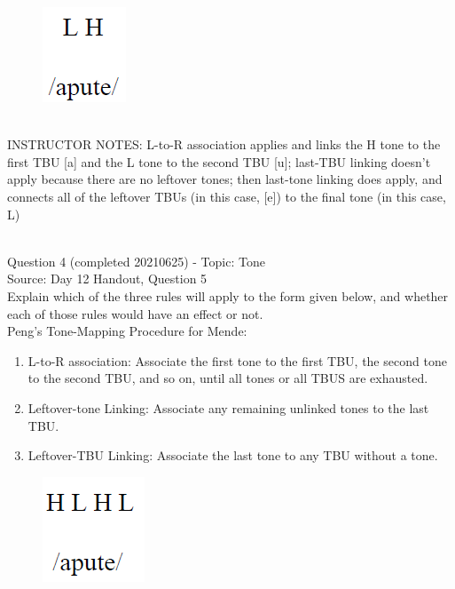\documentclass[12pt]{article}
\begin{document}
\begin{figure}[H]
\includegraphics{../images/mendetone_c.png}
\end{figure}

~\\
INSTRUCTOR NOTES: L-to-R association applies and links the H tone to the first TBU [a] and the L tone to the second TBU [u]; last-TBU linking doesn't apply because there are no leftover tones; then last-tone linking does apply, and connects all of the leftover TBUs (in this case, [e]) to the final tone (in this case, L)


~\\

{\large Question 4} (completed 20210625) - Topic: Tone\\
Source: Day 12 Handout, Question 5\\

Explain which of the three rules will apply to the form given below, and whether each of those rules would have an effect or not.\\

Peng’s Tone-Mapping Procedure for Mende: \begin{enumerate} \item L-to-R association: Associate the first tone to the first TBU, the second tone to the second TBU, and so on, until all tones or all TBUS are exhausted. \item Leftover-tone Linking: Associate any remaining unlinked tones to the last TBU. \item Leftover-TBU Linking: Associate the last tone to any TBU without a tone. \end{enumerate}

\begin{figure}[H]
\includegraphics{../images/mendetone_d.png}
\end{figure}
\end{document}
